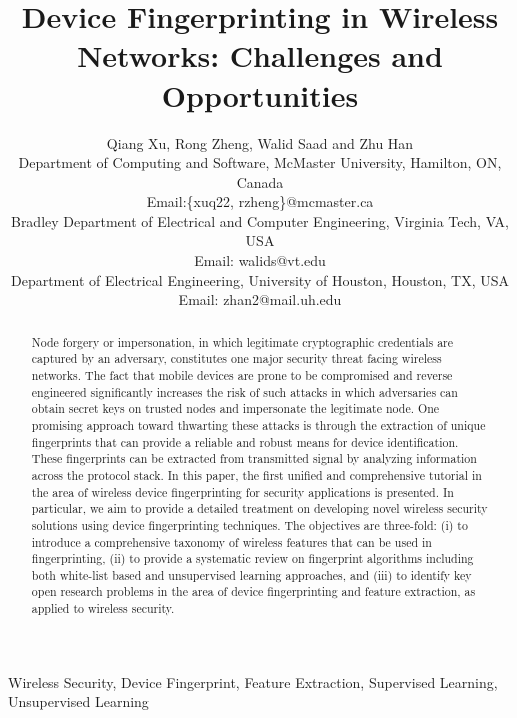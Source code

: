 \documentclass[journal,draftcls,onecolumn,11pt]{IEEEtran}
\newcounter{ctr}\setcounter{ctr}{0}
\begin{document}
\title{ Device Fingerprinting in Wireless Networks: Challenges and Opportunities}
\author{Qiang Xu, Rong Zheng, Walid Saad and Zhu Han \\
Department of Computing and Software, McMaster University, Hamilton, ON, Canada\\
Email:\{xuq22, rzheng\}@mcmaster.ca \\
Bradley Department of Electrical and Computer Engineering, Virginia Tech, VA, USA \\
Email: walids@vt.edu \\
Department of Electrical Engineering, University of Houston, Houston, TX, USA \\
Email: zhan2@mail.uh.edu
}

\maketitle 
\begin{abstract} 
Node forgery or impersonation, in which legitimate cryptographic credentials are captured by an adversary, constitutes one major security threat facing wireless networks. The fact that mobile devices are prone to be compromised and reverse engineered significantly increases the risk of such attacks in which adversaries can obtain secret keys on trusted nodes and impersonate the legitimate node. One promising approach toward thwarting these attacks is through the extraction of unique fingerprints that can provide a reliable and robust means for device identification. These fingerprints can be extracted from transmitted signal by analyzing information across the protocol stack. In this paper, the first unified and comprehensive tutorial in the area of wireless device fingerprinting for security applications is presented. In particular, we aim to provide a detailed treatment on developing novel wireless security solutions using device fingerprinting techniques. The objectives are three-fold: (i) to introduce a comprehensive taxonomy of wireless features that can be used in fingerprinting, (ii) to provide a systematic review on fingerprint algorithms including both white-list based and unsupervised learning approaches, and (iii) to identify key open research problems in the area of device fingerprinting and feature extraction, as applied to wireless security. 
\end{abstract}

\begin{keywords} 
Wireless Security, Device Fingerprint, Feature Extraction, Supervised Learning, Unsupervised Learning 
\end{keywords}
\end{document}
